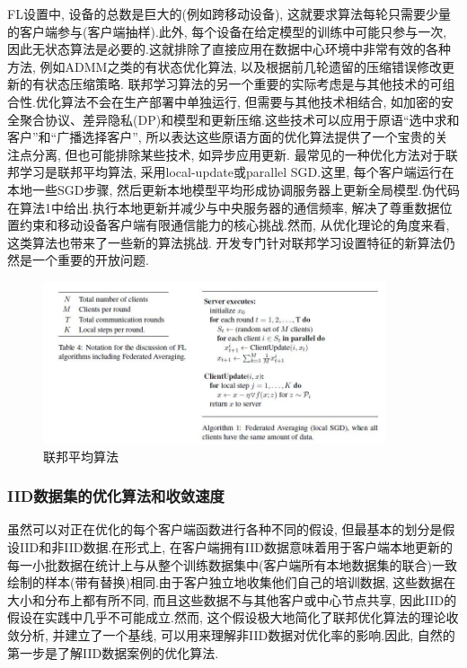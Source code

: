\documentclass[a4paper]{article}
\theoremstyle{definition}
\numberwithin{equation}{section}
\begin{document}
FL设置中, 设备的总数是巨大的(例如跨移动设备), 这就要求算法每轮只需要少量的客户端参与(客户端抽样).此外, 每个设备在给定模型的训练中可能只参与一次, 因此无状态算法是必要的.这就排除了直接应用在数据中心环境中非常有效的各种方法, 例如ADMM之类的有状态优化算法, 以及根据前几轮遗留的压缩错误修改更新的有状态压缩策略.
联邦学习算法的另一个重要的实际考虑是与其他技术的可组合性.优化算法不会在生产部署中单独运行, 但需要与其他技术相结合, 如加密的安全聚合协议、差异隐私(DP)和模型和更新压缩.这些技术可以应用于原语“选中求和客户”和“广播选择客户”, 所以表达这些原语方面的优化算法提供了一个宝贵的关注点分离, 但也可能排除某些技术, 如异步应用更新.
最常见的一种优化方法对于联邦学习是联邦平均算法\citep{mcmahan2016communication}, 采用local-update或parallel SGD.这里, 每个客户端运行在本地一些SGD步骤, 然后更新本地模型平均形成协调服务器上更新全局模型.伪代码在算法1中给出.执行本地更新并减少与中央服务器的通信频率, 解决了尊重数据位置约束和移动设备客户端有限通信能力的核心挑战.然而, 从优化理论的角度来看, 这类算法也带来了一些新的算法挑战. 开发专门针对联邦学习设置特征的新算法仍然是一个重要的开放问题.
\begin{figure}[ht]
    \setlength{\abovecaptionskip}{0.1cm}
    \centering    
    \includegraphics[width=0.9\textwidth]{Federated_Averging.jpg}
    \caption{联邦平均算法}
\end{figure}

\subsubsection{ IID数据集的优化算法和收敛速度}

虽然可以对正在优化的每个客户端函数进行各种不同的假设, 但最基本的划分是假设IID和非IID数据.在形式上, 在客户端拥有IID数据意味着用于客户端本地更新的每一小批数据在统计上与从整个训练数据集中(客户端所有本地数据集的联合)一致绘制的样本(带有替换)相同.由于客户独立地收集他们自己的培训数据, 这些数据在大小和分布上都有所不同, 而且这些数据不与其他客户或中心节点共享, 因此IID的假设在实践中几乎不可能成立.然而, 这个假设极大地简化了联邦优化算法的理论收敛分析, 并建立了一个基线, 可以用来理解非IID数据对优化率的影响.因此, 自然的第一步是了解IID数据案例的优化算法.
 
\end{document}
